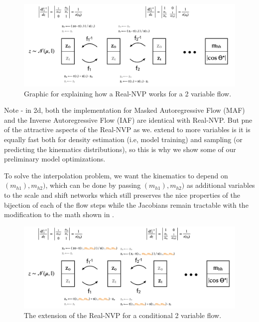 \begin{figure}[hbt]
    \centering
    \includegraphics[width=\textwidth]{figures/flows/flow-architectures/Real-NVP-graphic}
    \caption{Graphic for explaining how a Real-NVP works for a 2 variable flow.}
    \label{fig:rnvp-graphic}
\end{figure}

Note - in 2d, both the implementation for Masked Autoregressive Flow (MAF) \cite{MAF} and the Inverse Autoregressive Flow (IAF) \cite{IAF} are identical with Real-NVP. 
But pne of the attractive aspects of the Real-NVP as we. extend to more variables is it is equally fast both for density estimation (i.e, model training) and sampling (or predicting the kinematics distributions), so this is why we show some of our preliminary model optimizations.

To solve the interpolation problem, we want the kinematics to depend on $(m_{h1}),m_{h2})$, which can be done by passing $(m_{h1}),m_{h2})$ as additional variables to the scale and shift networks which still preserves the nice properties of the bijection of each of the flow steps while the Jacobians remain tractable with the modification to the math shown in \Fig{\ref{fig:rnvp-cond}}.

\begin{figure}[hbt]
    \centering
    \includegraphics[width=\textwidth]{figures/flows/flow-architectures/Real-NVP-conditional}
    \caption{The extension of the Real-NVP for a conditional 2 variable flow.}
    \label{fig:rnvp-cond}
\end{figure}

